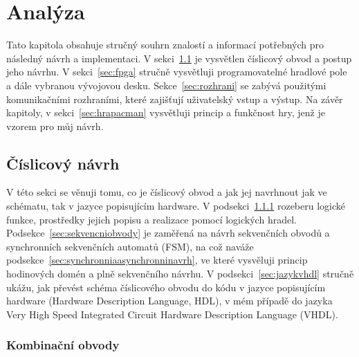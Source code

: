 \documentclass{report}
\begin{document}
\chapter{Analýza}
Tato kapitola obsahuje stručný souhrn znalostí a informací potřebných pro následný návrh a implementaci. V sekci~\ref{sec:cislicovynavrh} je vysvětlen číslicový obvod a postup jeho návrhu. V sekci~\ref{sec:fpga} stručně vysvětluji programovatelné hradlové pole a dále vybranou vývojovou desku. Sekce~\ref{sec:rozhrani} se zabývá použitými komunikačními rozhraními, které zajišťují uživatelský vstup a výstup. Na závěr kapitoly, v sekci~\ref{sec:hrapacman} vysvětluji princip a funkčnost hry, jenž je vzorem pro můj návrh.

\section{Číslicový návrh}\label{sec:cislicovynavrh}
V této sekci se věnuji tomu, co je číslicový obvod a jak jej navrhnout jak ve schématu, tak v jazyce popisujícím hardware. V podsekci~\ref{sec:kombinacniobvody} rozeberu logické funkce, prostředky jejich popisu a realizace pomocí logických hradel. Podsekce~\ref{sec:sekvencniobvody}  je zaměřená na návrh sekvenčních obvodů a synchronních sekvenčních automatů (FSM), na což naváže podsekce~\ref{sec:synchronniaasynchronninavrh}, ve které vysvěluji princip hodinových domén a plně sekvenčního návrhu. V podsekci~\ref{sec:jazykvhdl} stručně ukážu, jak převést schéma číslicového obvodu do kódu v jazyce popisujícím hardware (Hardware Description Language, HDL), v mém případě do jazyka Very High Speed Integrated Circuit Hardware Description Language (VHDL).


\subsection{Kombinační obvody}\label{sec:kombinacniobvody}
\end{document}

